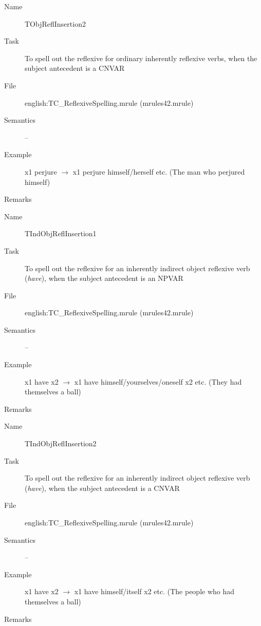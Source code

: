 \begin{description}
\vspace{1 cm}
\begin{description}
\item[Name] TObjReflInsertion2
\item[Task] To spell out the reflexive for ordinary inherently reflexive verbs, 
when the subject antecedent is a CNVAR
\item[File] english:TC\_ReflexiveSpelling.mrule (mrules42.mrule)
\item[Semantics] --
\item[Example] x1 perjure $\rightarrow$ x1 perjure himself/herself 
etc. (The man who perjured himself)
\item[Remarks]
\end{description}

\vspace{1 cm}
\begin{description}
\item[Name] TIndObjReflInsertion1
\item[Task] To spell out the reflexive for an inherently indirect object 
reflexive verb ({\em have\/}), when the subject antecedent is an NPVAR
\item[File] english:TC\_ReflexiveSpelling.mrule (mrules42.mrule)
\item[Semantics] --
\item[Example] x1 have x2 $\rightarrow$ x1 have himself/yourselves/oneself x2
etc. (They had themselves a ball)
\item[Remarks]
\end{description}

\vspace{1 cm}
\begin{description}
\item[Name] TIndObjReflInsertion2
\item[Task] To spell out the reflexive for an inherently indirect object 
reflexive verb ({\em have\/}), when the subject antecedent is a CNVAR
\item[File] english:TC\_ReflexiveSpelling.mrule (mrules42.mrule)
\item[Semantics] --
\item[Example] x1 have x2 $\rightarrow$ x1 have himself/itself x2
etc. (The people who had themselves a ball)
\item[Remarks]
\end{description}


\end{description}
